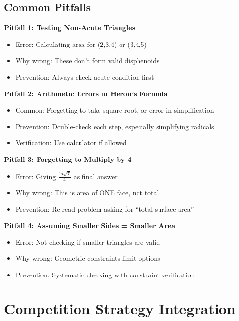 \documentclass[12pt]{article}
\begin{document}
\begin{solutionbox}
\subsection*{Common Pitfalls}

\textbf{Pitfall 1: Testing Non-Acute Triangles}
\begin{itemize}
    \item Error: Calculating area for (2,3,4) or (3,4,5)
    \item Why wrong: These don't form valid disphenoids
    \item Prevention: Always check acute condition first
\end{itemize}

\textbf{Pitfall 2: Arithmetic Errors in Heron's Formula}
\begin{itemize}
    \item Common: Forgetting to take square root, or error in simplification
    \item Prevention: Double-check each step, especially simplifying radicals
    \item Verification: Use calculator if allowed
\end{itemize}

\textbf{Pitfall 3: Forgetting to Multiply by 4}
\begin{itemize}
    \item Error: Giving $\frac{15\sqrt{7}}{4}$ as final answer
    \item Why wrong: This is area of ONE face, not total
    \item Prevention: Re-read problem asking for ``total surface area''
\end{itemize}

\textbf{Pitfall 4: Assuming Smaller Sides = Smaller Area}
\begin{itemize}
    \item Error: Not checking if smaller triangles are valid
    \item Why wrong: Geometric constraints limit options
    \item Prevention: Systematic checking with constraint verification
\end{itemize}

\end{solutionbox}

\section{Competition Strategy Integration}
\end{document}
